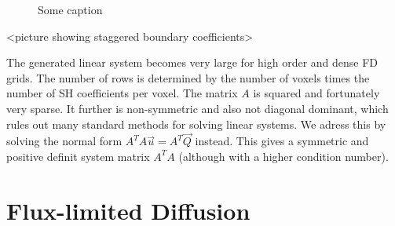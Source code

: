 \begin{figure}[h]
\centering
{}
\caption{Some caption}
\label{nicefigure}
\end{figure}

<picture showing staggered boundary coefficients>

The generated linear system becomes very large for high order and dense FD grids. The number of rows is determined by the number of voxels times the number of SH coefficients per voxel. The matrix $A$ is squared and fortunately very sparse. It further is non-symmetric and also not diagonal dominant, which rules out many standard methods for solving linear systems. We adress this by solving the normal form $A^TA\vec{u}=A^T\vec{Q}$ instead. This gives a symmetric and positive definit system matrix $A^TA$ (although with a higher condition number).



\section{Flux-limited Diffusion}
\label{sec:vef}

